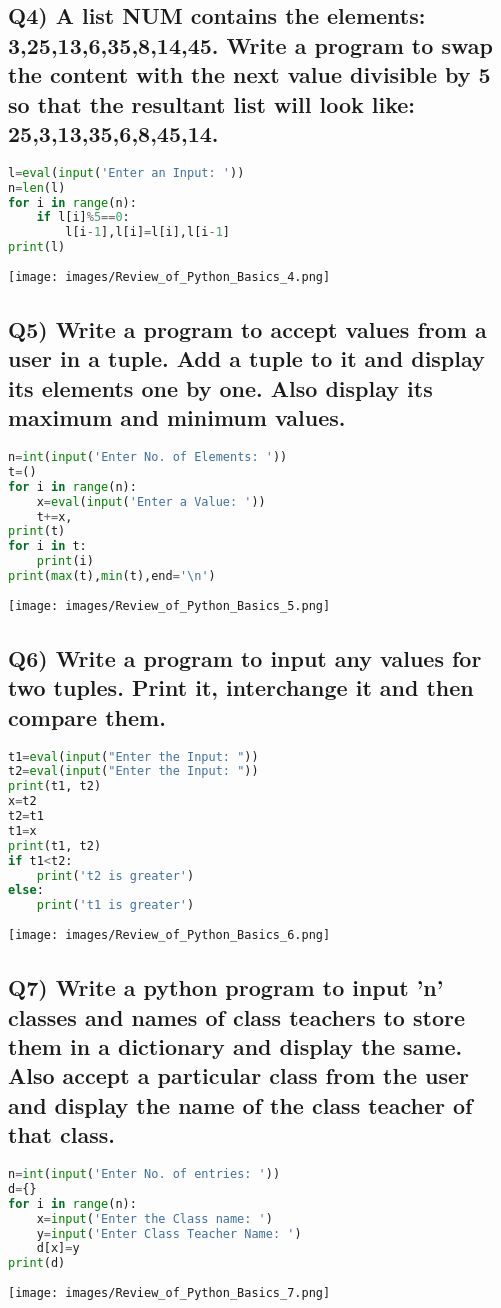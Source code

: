 \documentclass{article}
\begin{document}
\subsection*{Q4) A list NUM contains the elements: 3,25,13,6,35,8,14,45. Write a program to swap the content with the next value divisible by 5 so that the resultant list will look like: 25,3,13,35,6,8,45,14.}
\begin{lstlisting}[language=Python]
l=eval(input('Enter an Input: '))
n=len(l)
for i in range(n):
    if l[i]%5==0:
        l[i-1],l[i]=l[i],l[i-1]
print(l)
\end{lstlisting}
\texttt{[image: images/Review\_of\_Python\_Basics\_4.png]}

\subsection*{Q5) Write a program to accept values from a user in a tuple. Add a tuple to it and display its elements one by one. Also display its maximum and minimum values.}
\begin{lstlisting}[language=Python]
n=int(input('Enter No. of Elements: '))
t=()
for i in range(n):
    x=eval(input('Enter a Value: '))
    t+=x,
print(t)
for i in t:
    print(i)
print(max(t),min(t),end='\n')
\end{lstlisting}
\texttt{[image: images/Review\_of\_Python\_Basics\_5.png]}

\subsection*{Q6) Write a program to input any values for two tuples. Print it, interchange it and then compare them.}
\begin{lstlisting}[language=Python]
t1=eval(input("Enter the Input: "))
t2=eval(input("Enter the Input: "))
print(t1, t2)
x=t2
t2=t1
t1=x
print(t1, t2)
if t1<t2:
    print('t2 is greater')
else:
    print('t1 is greater')
\end{lstlisting}
\texttt{[image: images/Review\_of\_Python\_Basics\_6.png]}

\subsection*{Q7) Write a python program to input 'n' classes and names of class teachers to store them in a dictionary and display the same. Also accept a particular class from the user and display the name of the class teacher of that class.}
\begin{lstlisting}[language=Python]
n=int(input('Enter No. of entries: '))
d={}
for i in range(n):
    x=input('Enter the Class name: ')
    y=input('Enter Class Teacher Name: ')
    d[x]=y
print(d)
\end{lstlisting}
\texttt{[image: images/Review\_of\_Python\_Basics\_7.png]}
\end{document}
